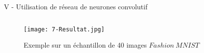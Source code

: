 \begin{frame}{V - Utilisation de réseau de neurones convolutif}
	\begin{columns}[T]
		\begin{column}{.70\textwidth}
			\begin{figure}
				\centering
				\texttt{[image: 7-Resultat.jpg]}
				\caption{Exemple sur un échantillon de 40 images $Fashion\ MNIST$}
			\end{figure}
		\end{column}
		\hfill
		\begin{column}{.30\textwidth}
			\bigskip	\bigskip	\bigskip
			
		\end{column}
	\end{columns}
\end{frame}
